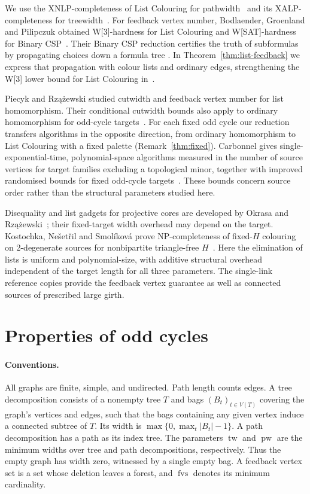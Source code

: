 \documentclass[11pt]{article}
\theoremstyle{remark}
\DeclareMathOperator{\tw}{tw}
\DeclareMathOperator{\pw}{pw}
\DeclareMathOperator{\fvs}{fvs}
\begin{document}
We use the XNLP-completeness of List Colouring for
pathwidth~\cite[Theorem~15]{bgns2024} and its XALP-completeness for
treewidth~\cite[Theorem~8]{bggpp2022}.
For feedback vertex number, Bodlaender, Groenland and Pilipczuk obtained
W[3]-hardness for List Colouring and W[SAT]-hardness for Binary
CSP~\cite[Table~1]{bgp2023}. Their Binary CSP reduction certifies the truth
of subformulas by propagating choices down a formula tree
\cite[Lemmas~11 and~14]{bgp2023full}. In
Theorem~\ref{thm:list-feedback} we express that propagation with colour
lists and ordinary edges, strengthening the W[3] lower bound for List
Colouring in~\cite[Corollary~34]{bgp2023full}.

Piecyk and Rz\k{a}\.{z}ewski studied cutwidth and feedback vertex number for
list homomorphism. Their conditional cutwidth bounds also apply to ordinary
homomorphism for odd-cycle targets~\cite{pr2021}. For each fixed odd cycle
our reduction transfers algorithms in the opposite direction, from ordinary
homomorphism to List Colouring with a fixed palette
(Remark~\ref{thm:fixed}).
Carbonnel gives single-exponential-time, polynomial-space algorithms measured
in the number of source vertices for target families excluding a topological
minor, together with improved randomised bounds for fixed odd-cycle
targets~\cite[Theorems~1 and~2]{carbonnel2026}. These bounds concern source
order rather than the structural parameters studied here.

Disequality and list gadgets for projective cores are developed by Okrasa and
Rz\k{a}\.{z}ewski~\cite[preprint version, Lemma~17 and Proposition~19]{or2021}; their fixed-target
width overhead may depend on the target. Kostochka, Ne\v{s}et\v{r}il and
Smol\'ikov\'a prove NP-completeness of fixed-$H$ colouring on 2-degenerate
sources for nonbipartite triangle-free $H$~\cite[Theorem~1.3]{kns2001}.
Here the elimination of lists is uniform and polynomial-size, with additive
structural overhead independent of the target length for all three parameters.
The single-link reference copies provide the feedback vertex guarantee as well
as connected sources of prescribed large girth.

\section{Properties of odd cycles}
\paragraph{Conventions.}
All graphs are finite, simple, and undirected. Path length counts edges.
A tree decomposition consists of a nonempty tree $T$ and bags
$(B_t)_{t\in V(T)}$ covering the graph's vertices and edges, such that
the bags containing any given vertex induce a connected subtree of $T$.
Its width is $\max\{0,\max_t |B_t|-1\}$. A path decomposition has a path as
its index tree. The parameters $\tw$ and $\pw$ are the minimum widths
over tree and path decompositions, respectively.
Thus the empty graph has width zero, witnessed by a single
empty bag. A feedback vertex set is a set whose
deletion leaves a forest, and $\fvs$ denotes its minimum cardinality.
\end{document}
